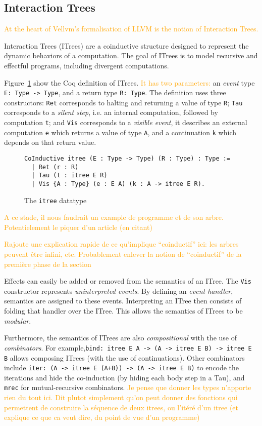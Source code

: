 \documentclass[11pt]{article}
\newcommand{\inlinecoq}[1]{\mbox{\lstinline[style=customcoq,columns=fixed,basewidth=.48em]{#1}}}
\newcommand{\ilc}[1]{\inlinecoq{#1}}
\newcommand{\gr}[1]{\textcolor{Orange}{#1}}
\begin{document}
\subsection{Interaction Trees}

\gr{At the heart of Vellvm's formalisation of LLVM is the notion of Interaction Trees.}


Interaction Trees (ITrees) are a coinductive structure designed to represent the dynamic behaviors of a computation. The goal of ITrees is to model recursive and effectful programs, including divergent computations.

Figure~\ref{fig:itree} show the Coq definition of ITrees. \gr{It has two parameters:} an \emph{event} type \ilc{E: Type -> Type}, and a return type \ilc{R: Type}. The definition uses three constructors: \ilc{Ret} corresponds to halting and returning a value of type \ilc{R}; \ilc{Tau} corresponds to a \emph{silent step}, i.e. an internal computation, followed by computation \ilc{t}; and \ilc{Vis} corresponds to a \emph{visible event}, it describes an external computation \ilc{e} which returns a value of type \ilc{A}, and a continuation \ilc{k} which depends on that return value.

\begin{figure}
  \begin{lstlisting}[style=customcoq,basicstyle=\small\ttfamily]
CoInductive itree (E : Type -> Type) (R : Type) : Type :=
  | Ret (r : R)
  | Tau (t : itree E R)
  | Vis {A : Type} (e : E A) (k : A -> itree E R).
  \end{lstlisting}
  \caption{The \ilc{itree} datatype}
  \label{fig:itree}
\end{figure}

\gr{A ce stade, il nous faudrait un example de programme et de son arbre. Potentielement le piquer d'un article (en citant)}

\gr{Rajoute une explication rapide de ce qu'implique ``coinductif'' ici: les arbres peuvent être infini, etc. Probablement enlever la notion de ``coinductif'' de la première phase de la section}

Effects can easily be added or removed from the semantics of an ITree. The \ilc{Vis} constructor represents \emph{uninterpreted events}. By defining an \emph{event handler}, semantics are assigned to these events. Interpreting an ITree then consists of folding that handler over the ITree. This allows the semantics of ITrees to be \emph{modular}.

Furthermore, the semantics of ITrees are also \emph{compositional} with the use of \emph{combinators}. For example,\ilc{bind: itree E A -> (A -> itree E B) -> itree E B} allows composing ITrees (with the use of continuations).
Other combinators include \ilc{iter: (A -> itree E (A+B)) -> (A -> itree E B)} to encode the iterations and hide the co-induction (by hiding each body step in a Tau), and \ilc{mrec} for mutual-recursive combinators. 
\gr{Je pense que donner les types n'apporte rien du tout ici. Dit plutot simplement qu'on peut donner des fonctions qui permettent de construire la séquence de deux itrees, ou l'itéré d'un itree (et explique ce que ca veut dire, du point de vue d'un programme)}
\end{document}
